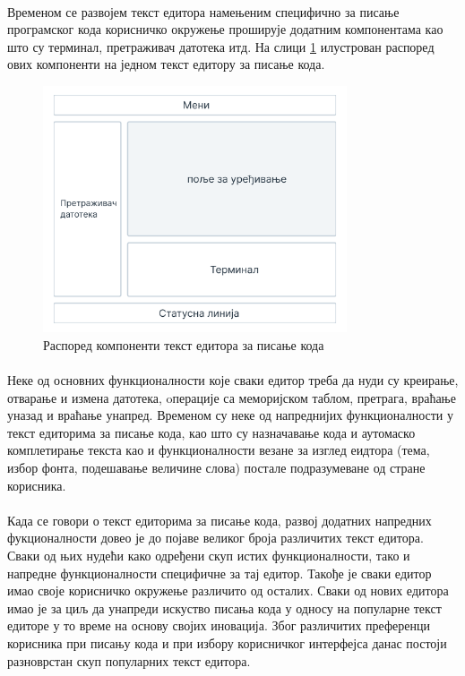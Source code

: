 \documentclass[12pt,oneside]{memoir}
\begin{document}
\paragraph{}
Временом се развојем текст едитора намењеним специфично за писање програмског кода
корисничко окружење проширује додатним компонентама као што су терминал, претраживач
датотека итд. На слици \ref{fig:layout} илустрован распоред ових
компоненти на једном текст едитору за писање кода.

\begin{figure}[!ht]
	\centering
	\includegraphics[width=0.8\textwidth]{images/raspored.png}
	\caption{Распоред компоненти текст едитора за писање кода}
	\label{fig:layout}
\end{figure}

\paragraph{}
Неке од основних функционалности које сваки едитор треба да нуди су креирање, отварање
и измена датотека, oперације са меморијском таблом, претрага, враћање уназад и 
враћање унапред. Временом су неке од напреднијих функционалности у текст едиторима
за писање кода, као што су назначавање кода и аутомаско комплетирање текста као и
функционалности везане за изглед еидтора (тема, избор фонта, подешавање величине слова)
постале подразумеване од стране корисника.

\paragraph{}
Када се говори о текст едиторима за писање кода, развој додатних напредних фукционалности
довео је до појаве великог броја различитих текст едитора. Сваки од њих нудећи како
одређени скуп истих функционалности, тако и напредне функционалности специфичне за тај
едитор. Такође је сваки едитор имао своје корисничко окружење различито од осталих. Сваки од нових едитора имао је за циљ да унапреди искуство писања кода у односу на популарне
текст едиторе у то време на основу својих иновација. Због различитих преференци корисника
при писању кода и при избору корисничког интерфејса данас постоји разноврстан скуп
популарних текст едитора.
\end{document}
